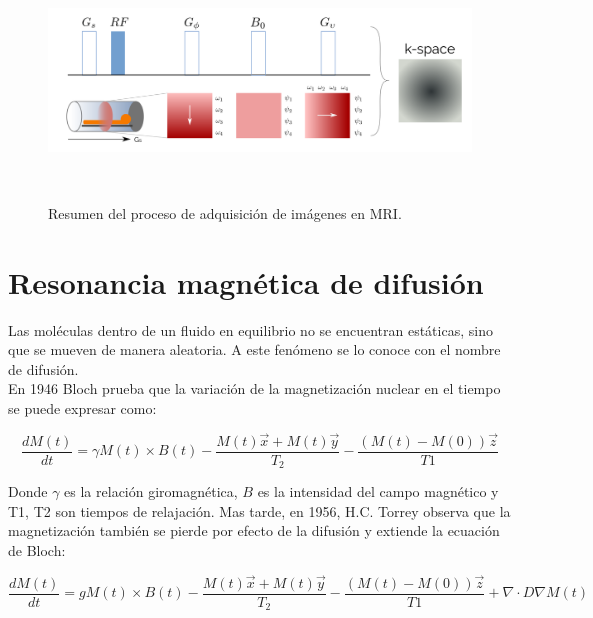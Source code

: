 \begin{figure}[h!]
                                                                                                                        
\begin{minipage}[b]{\textwidth}
    \includegraphics[width=\textwidth]{img/kspace.png}
    \caption{Resumen del proceso de adquisici\'on de im\'agenes en MRI.}
    \label{fig:kspace}
\end{minipage} ~

\end{figure}  



\section{Resonancia magn\'etica de difusi\'on}

Las mol\'eculas dentro de un fluido en equilibrio no se encuentran 
est\'aticas, sino que se mueven de manera aleatoria. A este fen\'omeno se
lo conoce con el nombre de difusi\'on. \\

En 1946 Bloch \cite{Bloch1946} prueba que la variaci\'on de la 
magnetizaci\'on nuclear en el tiempo se puede expresar como:

$$ \frac{dM(t)}{dt} = \gamma M(t) \times B(t) 
                      - \frac{M(t) \vec{x} + M(t)\vec{y}}{T_2}
                      - \frac{(M(t)-M(0))\vec{z}}{T1} $$

Donde $\gamma$ es la relaci\'on giromagn\'etica, $B$ es la intensidad del
campo magn\'etico y T1, T2 son tiempos de relajaci\'on. Mas tarde, en
1956, H.C. Torrey \cite{Torrey1956} observa que la magnetizaci\'on 
tambi\'en se pierde por efecto de la difusi\'on y extiende la ecuaci\'on
de Bloch:

$$ \frac{dM(t)}{dt} = g M(t) \times B(t) 
                      - \frac{M(t) \vec{x} + M(t)\vec{y}}{T_2}
                      - \frac{(M(t)-M(0))\vec{z}}{T1} 
                      + \nabla \cdot D \nabla M(t) $$

